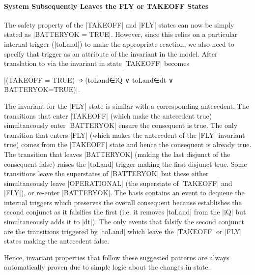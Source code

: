 \paragraph{System Subsequently Leaves the FLY or TAKEOFF States}
The safety property of the |TAKEOFF| and |FLY| states can now be simply stated as |BATTERYOK = TRUE|. 
However, since this relies on a particular internal trigger (|toLand|) to make the appropriate reaction, we also need to specify that trigger as an attribute of the invariant in the \SCXML model.
After translation to \EVENTB via \UMLB the invariant in state |TAKEOFF| becomes 
\begin{center}
 |(TAKEOFF = TRUE) ⇒ (toLand∈iQ ∨ toLand∈dt ∨ BATTERYOK=TRUE)|.
\end{center}
The invariant for the |FLY| state is similar with a corresponding antecedent.
The transitions that enter |TAKEOFF| (which make the antecedent true) simultaneously enter |BATTERYOK| ensure the consequent is true.
The only transition that enters |FLY| (which makes the antecedent of the |FLY| invariant true) comes from the |TAKEOFF| state and hence the consequent is already true.
The transition that leaves |BATTERYOK| (making the last disjunct of the consequent false) raises the |toLand| trigger making the first disjunct true.
Some transitions leave the superstates of |BATTERYOK| but these either simultaneously leave |OPERATIONAL| (the superstate of |TAKEOFF| and |FLY|), or re-enter |BATTERYOK|.
The basis contains an event to dequeue the internal triggers which preserves the overall consequent because establishes the second conjunct as it falsifies the first (i.e. it removes |toLand| from the |iQ| but simultaneously adds it to |dt|).
The only events that falsify the second conjunct are the transitions triggered by |toLand| which leave the |TAKEOFF| or |FLY| states making the antecedent false.

Hence, invariant properties that follow these suggested patterns are always automatically proven due to simple logic about the changes in state.

